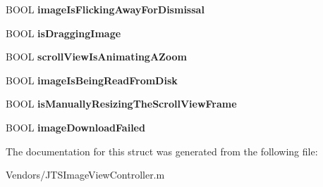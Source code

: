 \begin{DoxyCompactItemize}
\item 
\hypertarget{struct_j_t_s_image_view_controller_flags_a8bacc7bffbe142260c2a92ef91cb77e4}{}B\+O\+O\+L {\bfseries image\+Is\+Flicking\+Away\+For\+Dismissal}\label{struct_j_t_s_image_view_controller_flags_a8bacc7bffbe142260c2a92ef91cb77e4}

\item 
\hypertarget{struct_j_t_s_image_view_controller_flags_afa8e2dd85e3db841aa2dae3fba6f7204}{}B\+O\+O\+L {\bfseries is\+Dragging\+Image}\label{struct_j_t_s_image_view_controller_flags_afa8e2dd85e3db841aa2dae3fba6f7204}

\item 
\hypertarget{struct_j_t_s_image_view_controller_flags_acc5917ed6aa404789a08311e832ec998}{}B\+O\+O\+L {\bfseries scroll\+View\+Is\+Animating\+A\+Zoom}\label{struct_j_t_s_image_view_controller_flags_acc5917ed6aa404789a08311e832ec998}

\item 
\hypertarget{struct_j_t_s_image_view_controller_flags_a17589ed29ce8e6bb63de54fab83f1b5b}{}B\+O\+O\+L {\bfseries image\+Is\+Being\+Read\+From\+Disk}\label{struct_j_t_s_image_view_controller_flags_a17589ed29ce8e6bb63de54fab83f1b5b}

\item 
\hypertarget{struct_j_t_s_image_view_controller_flags_a088200463e7e1262d3622ea0323148bc}{}B\+O\+O\+L {\bfseries is\+Manually\+Resizing\+The\+Scroll\+View\+Frame}\label{struct_j_t_s_image_view_controller_flags_a088200463e7e1262d3622ea0323148bc}

\item 
\hypertarget{struct_j_t_s_image_view_controller_flags_af5d5f10cac2d89f09585738b46d2395b}{}B\+O\+O\+L {\bfseries image\+Download\+Failed}\label{struct_j_t_s_image_view_controller_flags_af5d5f10cac2d89f09585738b46d2395b}

\end{DoxyCompactItemize}


The documentation for this struct was generated from the following file\+:\begin{DoxyCompactItemize}
\item 
Vendors/J\+T\+S\+Image\+View\+Controller.\+m\end{DoxyCompactItemize}
